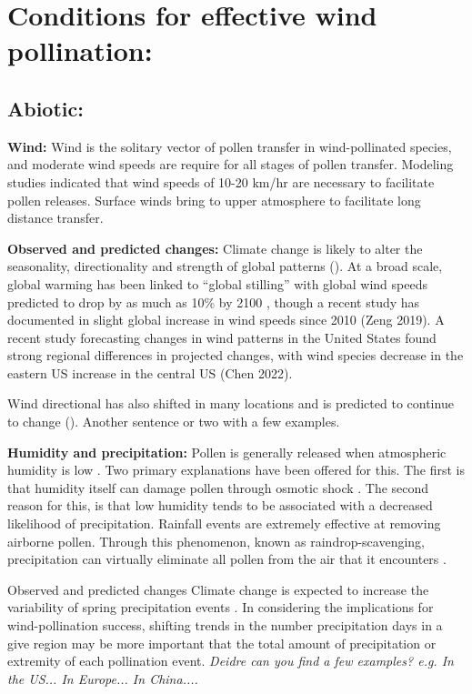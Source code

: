 \documentclass[12pt]{article}
\begin{document}
\section*{Conditions for effective wind pollination:}

\subsection*{Abiotic:}

\textbf{Wind:} Wind is the solitary vector of pollen transfer in wind-pollinated species, and moderate wind speeds are require for all stages of pollen transfer. Modeling studies indicated that wind speeds of 10-20 km/hr are necessary to facilitate pollen releases. Surface winds bring to upper atmosphere to facilitate long distance transfer. 

\textbf{Observed and predicted changes:} Climate change is likely to alter the seasonality, directionality and strength of global patterns (). At a broad scale, global warming has been linked to “global stilling” with global wind speeds predicted to drop by as much as 10\% by 2100 \citep{IPCC2013}, though a recent study has documented in slight global increase in wind speeds since 2010 (Zeng 2019).
A recent study forecasting changes in wind patterns in the United States found strong regional differences in projected changes, with wind species decrease in the eastern US increase in the central US (Chen 2022).

Wind directional has also shifted in many locations and is predicted to continue to change (). Another sentence or two with a few examples.





\textbf{Humidity and precipitation:} Pollen is generally released when atmospheric humidity is low \citep{Niklas1985, Whitehead1969}. Two primary explanations have been offered for this. The first is that humidity itself can damage pollen through osmotic shock \citep{Niklas1985}. The second reason for this, is that low humidity tends to be associated with a decreased likelihood of precipitation. Rainfall events are extremely effective at removing airborne pollen. Through this phenomenon, known as raindrop-scavenging, precipitation can virtually eliminate all pollen from the air that it encounters \citep{Kluska:2020aa}.

Observed and predicted changes 
Climate change is expected to increase the variability of spring precipitation events \citep{IPCC2013}. In considering the implications for wind-pollination success, shifting trends in the number precipitation days in a give region may be more important that the total amount of precipitation or extremity of each pollination event. \emph{Deidre can you find a few examples? e.g. In the US... In Europe... In China....}
\end{document}
